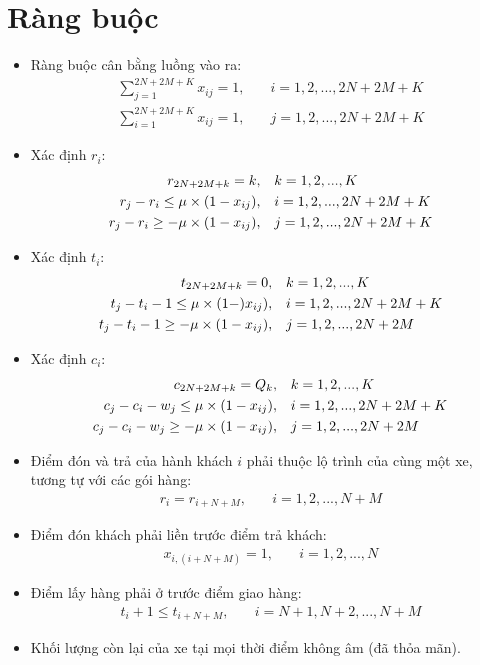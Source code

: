 \documentclass[3p,12pt]{article}
\begin{document}
	\section{Ràng buộc}
	\begin{itemize}
		\item Ràng buộc cân bằng luồng vào ra:
		\begin{align}
			\sum_{j=1}^{2N+2M+K} x_{ij} = 1,\quad & i=1,2,...,2N+2M+K \\
			\sum_{i=1}^{2N+2M+K} x_{ij} = 1,\quad & j=1,2,...,2N+2M+K
		\end{align}
		\item Xác định $r_i$:
		\begin{align}
			r_{2N+2M+k} = k,\quad & k=1,2,...,K \\
			r_j - r_i\leq \mu\times (1 - x_{ij}),\quad & i=1,2,...,2N+2M+K \\
			r_j - r_i\geq -\mu\times (1 -x_{ij}),\quad & j=1,2,...,2N+2M+K \notag
		\end{align}
		\item Xác định $t_i$:
		\begin{align}
			t_{2N+2M+k} = 0,\quad & k=1,2,...,K \\
			t_j - t_i -1\leq \mu\times (1 - )x_{ij}),\quad & i=1,2,...,2N+2M+K \\
			t_j - t_i -1\geq -\mu\times (1 - x_{ij}),\quad & j=1,2,...,2N+2M \notag
		\end{align}
		\item Xác định $c_i$:
		\begin{align}
			c_{2N+2M+k} = Q_k,\quad & k=1,2,...,K \\
			c_j - c_i - w_j\leq \mu\times (1 - x_{ij}),\quad & i=1,2,...,2N+2M+K \\
			c_j - c_i - w_j\geq -\mu\times (1 - x_{ij}),\quad & j=1,2,...,2N+2M \notag
		\end{align}
		\item Điểm đón và trả của hành khách $i$ phải thuộc lộ trình của cùng một xe, tương tự với các gói hàng:
		\begin{align}
			r_i = r_{i+N+M},\quad & i=1,2,...,N+M
		\end{align}
		\item Điểm đón khách phải liền trước điểm trả khách:
		\begin{align}
			x_{i,(i+N+M)} = 1,\quad & i=1,2,...,N
		\end{align}
		\item Điểm lấy hàng phải ở trước điểm giao hàng:
		\begin{align}
			t_i + 1\leq t_{i+N+M},\quad & i=N+1,N+2,...,N+M
		\end{align}
		\item Khối lượng còn lại của xe tại mọi thời điểm không âm (đã thỏa mãn).
	\end{itemize}
\end{document}
